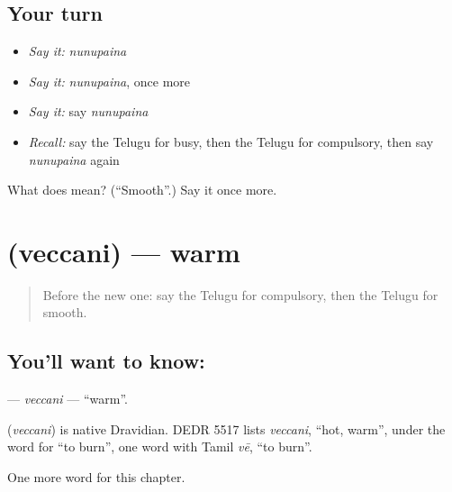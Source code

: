 \subsection*{Your turn}
\begin{itemize}
\raggedright
  \item \emph{Say it:} \emph{nunupaina}
  \item \emph{Say it:} \emph{nunupaina}, once more
  \item \emph{Say it:} say \emph{nunupaina}
  \item \emph{Recall:} say the Telugu for busy, then the Telugu for compulsory, then say \emph{nunupaina} again
\end{itemize}

\begin{tcolorbox}[breakable,colback=teal!4,colframe=teal!35!black,title={Before you move on}]
What does  mean? (\textquotedblleft{}Smooth\textquotedblright{}.) Say it once more.
\end{tcolorbox}
\section[\texorpdfstring{\te{వెచ్చని} (veccani)}{వెచ్చని (veccani)}]{ (veccani) — warm}

\label{lesson:TE-C260-veccani}



\begin{quote}
Before the new one: say the Telugu for compulsory, then the Telugu for smooth.
\end{quote}

\subsection*{You'll want to know: }
\textbf{} — \emph{veccani} — \textquotedblleft{}warm\textquotedblright{}.

\begin{cousinweb}
\textbf{} (\emph{veccani}) is native Dravidian. DEDR 5517 lists \emph{veccani}, \textquotedblleft{}hot, warm\textquotedblright{}, under the word for \textquotedblleft{}to burn\textquotedblright{}, one word with Tamil \emph{vē}, \textquotedblleft{}to burn\textquotedblright{}.
\end{cousinweb}

\begin{grammarlens}[title={What you've built}]
One more word for this chapter.
\end{grammarlens}

